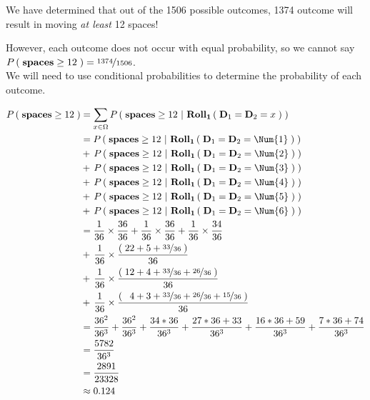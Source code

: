 \documentclass{ProblemSetCUNY}
\newcommand{\Prob}[1]{\ensuremath{P\Parens{#1}}\xspace}
\begin{document}
We have determined that out of the 1506 possible outcomes, 1374 outcome will result in moving \emph{at least} 12 spaces!

However, each outcome does not occur with equal probability, so we cannot say  $\Prob{\textbf{spaces} \ge 12} = \frac{1374}{1506}$.\\
We will need to use conditional probabilities to determine the probability of each outcome.

\begin{align*}
\Prob{\textbf{spaces} \ge 12}  &= \sum\limits_{x \in \Omega} \Prob{\textbf{spaces} \ge 12~|~ \Roll{1}{\Die{1} = \Die{2} = x}}\\
&= \Prob{\textbf{spaces} \ge 12~|~ \Roll{1}{\Die{1} = \Die{2} = \Num{1}}}\\
&+\,\Prob{\textbf{spaces} \ge 12~|~ \Roll{1}{\Die{1} = \Die{2} = \Num{2}}}\\
&+\,\Prob{\textbf{spaces} \ge 12~|~ \Roll{1}{\Die{1} = \Die{2} = \Num{3}}}\\
&+\,\Prob{\textbf{spaces} \ge 12~|~ \Roll{1}{\Die{1} = \Die{2} = \Num{4}}}\\
&+\,\Prob{\textbf{spaces} \ge 12~|~ \Roll{1}{\Die{1} = \Die{2} = \Num{5}}}\\
&+\,\Prob{\textbf{spaces} \ge 12~|~ \Roll{1}{\Die{1} = \Die{2} = \Num{6}}}\\
&= \frac{1}{36} \times \frac{36}{36} + \frac{1}{36} \times \frac{36}{36} + \frac{1}{36} \times \frac{34}{36}\\
&+\,\frac{1}{36} \times \frac{\Parens{ 22 + 5 + \frac{33}{36} } }{36}\\
&+\,\frac{1}{36} \times \frac{\Parens{ 12 + 4 + \frac{33}{36} + \frac{26}{36} } }{36}\\
&+\,\frac{1}{36} \times \frac{\Parens{ ~\,4 + 3 + \frac{33}{36} + \frac{26}{36} + \frac{15}{36} } }{36}\\
&= \frac{36^2}{36^3} + \frac{36^2}{36^3} + \frac{34*36}{36^3} + \frac{27*36 + 33}{36^3} + \frac{16*36 + 59}{36^3} +  \frac{7*36 + 74}{36^3}\\
&=\frac{5782}{36^3}\\
&=\frac{2891}{23328}\\
&\approx 0.124
\end{align*}




\StartExtraCredit
{}
\end{document}

